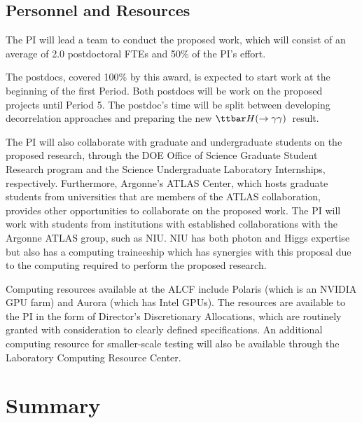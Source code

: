 \documentclass[letter, USenglish, 11pt, subfigure]{article}
\newcommand{\tthyy}{\ensuremath{\ttbar H(\to\gamma\gamma)}}
\begin{document}
\subsection{Personnel and Resources}
\label{sec:personnel}
The PI will lead a team to conduct the proposed work, which will consist of an average of 2.0 postdoctoral FTEs and 50\% of the PI's effort.

The postdocs, covered 100\% by this award, is expected to start work at the beginning of the first Period. Both postdocs will be work on the proposed projects until Period 5. The postdoc's time will be split between developing decorrelation approaches and preparing the new \tthyy\ result. 

The PI will also collaborate with graduate and undergraduate students on the proposed research, through the DOE Office of Science Graduate Student Research program and the Science Undergraduate Laboratory Internships, respectively. Furthermore, Argonne's ATLAS Center, which hosts graduate students from universities that are members of the ATLAS collaboration, provides other opportunities to collaborate on the proposed work. The PI will work with students from institutions with established collaborations with the Argonne ATLAS group, such as NIU. NIU has both photon and Higgs expertise but also has a computing traineeship which has synergies with this proposal due to the computing required to perform the proposed research.

Computing resources available at the ALCF include Polaris (which is an NVIDIA GPU farm) and Aurora (which has Intel GPUs). The resources are available to the PI in the form of Director's Discretionary Allocations, which are routinely granted with consideration to clearly defined specifications. An additional computing resource for smaller-scale testing will also be available through the Laboratory Computing Resource Center.


\section{Summary}


\clearpage
\end{document}
